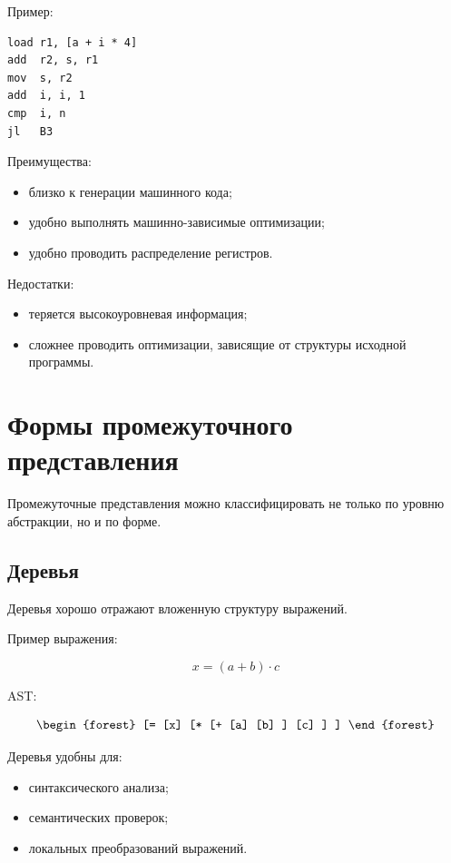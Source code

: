 \documentclass[12pt,a4paper]{article}
\begin{document}
Пример:

\begin{lstlisting}
load r1, [a + i * 4]
add  r2, s, r1
mov  s, r2
add  i, i, 1
cmp  i, n
jl   B3
\end{lstlisting}

Преимущества:
\begin{itemize}
    \item близко к генерации машинного кода;
    \item удобно выполнять машинно-зависимые оптимизации;
    \item удобно проводить распределение регистров.
\end{itemize}

Недостатки:
\begin{itemize}
    \item теряется высокоуровневая информация;
    \item сложнее проводить оптимизации, зависящие от структуры исходной программы.
\end{itemize}

\section{Формы промежуточного представления}

Промежуточные представления можно классифицировать не только по уровню абстракции, но и по форме.

\subsection{Деревья}

Деревья хорошо отражают вложенную структуру выражений.

Пример выражения:

\[
x = (a+b)\cdot c
\]

AST:

\[
\begin{forest}
[=
    [x]
    [*
        [+
            [a]
            [b]
        ]
        [c]
    ]
]
\end{forest}
\]

Деревья удобны для:
\begin{itemize}
    \item синтаксического анализа;
    \item семантических проверок;
    \item локальных преобразований выражений.
\end{itemize}
\end{document}
